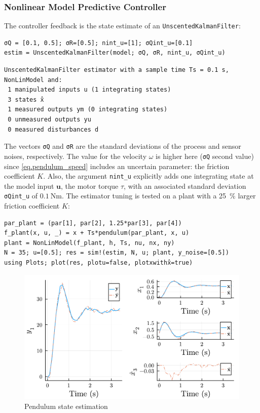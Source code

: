\subsubsection{Nonlinear Model Predictive Controller}

The controller feedback is the state estimate of an \texttt{UnscentedKalmanFilter}:

\begin{verbatim}
σQ = [0.1, 0.5]; σR=[0.5]; nint_u=[1]; σQint_u=[0.1]
estim = UnscentedKalmanFilter(model; σQ, σR, nint_u, σQint_u)
\end{verbatim}
\spacerepl
\begin{verbatim}
UnscentedKalmanFilter estimator with a sample time Ts = 0.1 s, 
NonLinModel and:
 1 manipulated inputs u (1 integrating states)
 3 states x̂
 1 measured outputs ym (0 integrating states)
 0 unmeasured outputs yu
 0 measured disturbances d
\end{verbatim}
The vectors \texttt{σQ} and \texttt{σR} are the standard deviations of the process and sensor noises, respectively. The value for the velocity $\omega$ is higher here (\texttt{σQ} second value) since \eqref{eq.pendulum_speed} includes an uncertain parameter: the friction coefficient $K$. Also, the argument \texttt{nint\_u} explicitly adds one integrating state at the model input $\mathbf{u}$, the motor torque $\tau$, with an associated standard deviation \texttt{σQint\_u} of $\SI{0.1}{\newton\meter}$. The estimator tuning is tested on a plant with a \SI{25}{\percent} larger friction coefficient $K$:
\begin{verbatim}
par_plant = (par[1], par[2], 1.25*par[3], par[4])
f_plant(x, u, _) = x + Ts*pendulum(par_plant, x, u)
plant = NonLinModel(f_plant, h, Ts, nu, nx, ny)
N = 35; u=[0.5]; res = sim!(estim, N, u; plant, y_noise=[0.5])
using Plots; plot(res, plotu=false, plotxwithx̂=true)
\end{verbatim}

\begin{figure}[h]
    \centering
    \includegraphics[width=\columnwidth]{fig/plot_NonLinMPC1.pdf}
    \caption{Pendulum state estimation}
    \label{fig:plot_NonLinMPC1}
\end{figure}

